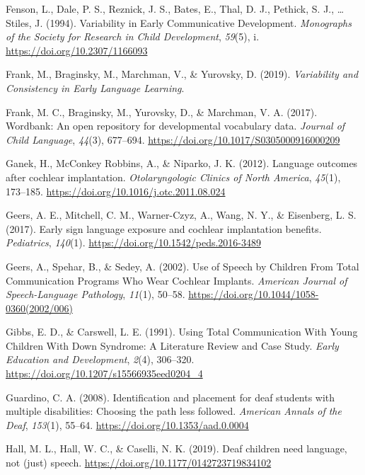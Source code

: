 \documentclass[english,man]{apa6}
\begin{document}
\leavevmode\hypertarget{ref-fenson1994}{}%
Fenson, L., Dale, P. S., Reznick, J. S., Bates, E., Thal, D. J., Pethick, S. J., \ldots{} Stiles, J. (1994). Variability in Early Communicative Development. \emph{Monographs of the Society for Research in Child Development}, \emph{59}(5), i. \url{https://doi.org/10.2307/1166093}

\leavevmode\hypertarget{ref-frank2019}{}%
Frank, M., Braginsky, M., Marchman, V., \& Yurovsky, D. (2019). \emph{Variability and Consistency in Early Language Learning}.

\leavevmode\hypertarget{ref-frank2017}{}%
Frank, M. C., Braginsky, M., Yurovsky, D., \& Marchman, V. A. (2017). Wordbank: An open repository for developmental vocabulary data. \emph{Journal of Child Language}, \emph{44}(3), 677--694. \url{https://doi.org/10.1017/S0305000916000209}

\leavevmode\hypertarget{ref-ganek2012}{}%
Ganek, H., McConkey Robbins, A., \& Niparko, J. K. (2012). Language outcomes after cochlear implantation. \emph{Otolaryngologic Clinics of North America}, \emph{45}(1), 173--185. \url{https://doi.org/10.1016/j.otc.2011.08.024}

\leavevmode\hypertarget{ref-geers2017}{}%
Geers, A. E., Mitchell, C. M., Warner-Czyz, A., Wang, N. Y., \& Eisenberg, L. S. (2017). Early sign language exposure and cochlear implantation benefits. \emph{Pediatrics}, \emph{140}(1). \url{https://doi.org/10.1542/peds.2016-3489}

\leavevmode\hypertarget{ref-geers2002}{}%
Geers, A., Spehar, B., \& Sedey, A. (2002). Use of Speech by Children From Total Communication Programs Who Wear Cochlear Implants. \emph{American Journal of Speech-Language Pathology}, \emph{11}(1), 50--58. \url{https://doi.org/10.1044/1058-0360(2002/006)}

\leavevmode\hypertarget{ref-gibbs1991}{}%
Gibbs, E. D., \& Carswell, L. E. (1991). Using Total Communication With Young Children With Down Syndrome: A Literature Review and Case Study. \emph{Early Education and Development}, \emph{2}(4), 306--320. \url{https://doi.org/10.1207/s15566935eed0204_4}

\leavevmode\hypertarget{ref-guardino2008}{}%
Guardino, C. A. (2008). Identification and placement for deaf students with multiple disabilities: Choosing the path less followed. \emph{American Annals of the Deaf}, \emph{153}(1), 55--64. \url{https://doi.org/10.1353/aad.0.0004}

\leavevmode\hypertarget{ref-hall2019}{}%
Hall, M. L., Hall, W. C., \& Caselli, N. K. (2019). Deaf children need language, not (just) speech. \url{https://doi.org/10.1177/0142723719834102}
\end{document}
